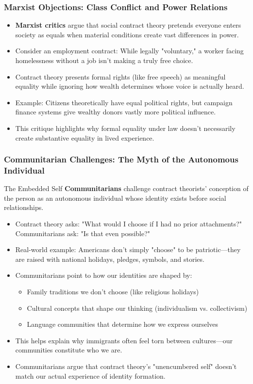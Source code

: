 \documentclass[aspectratio=169]{beamer}
\begin{document}
\begin{frame}
  \frametitle{Marxist Objections: Class Conflict and Power Relations}
  
  \begin{itemize}
    \item \textbf{Marxist critics} argue that social contract theory pretends everyone enters society as equals when material conditions create vast differences in power.
    \item Consider an employment contract: While legally "voluntary," a worker facing homelessness without a job isn't making a truly free choice.
    \item Contract theory presents formal rights (like free speech) as meaningful equality while ignoring how wealth determines whose voice is actually heard.
    \item Example: Citizens theoretically have equal political rights, but campaign finance systems give wealthy donors vastly more political influence.
    \item This critique highlights why formal equality under law doesn't necessarily create substantive equality in lived experience.
  \end{itemize}
\end{frame}

\begin{frame}
  \frametitle{Communitarian Challenges: The Myth of the Autonomous Individual}
  
  \begin{alertblock}{The Embedded Self}
    \textbf{Communitarians} challenge contract theorists' conception of the person as an autonomous individual whose identity exists before social relationships.
  \end{alertblock}
  
  \begin{itemize}
    \item Contract theory asks: "What would I choose if I had no prior attachments?" Communitarians ask: "Is that even possible?"
    \item Real-world example: Americans don't simply "choose" to be patriotic—they are raised with national holidays, pledges, symbols, and stories.
    \item Communitarians point to how our identities are shaped by:
      \begin{itemize}
        \item Family traditions we don't choose (like religious holidays)
        \item Cultural concepts that shape our thinking (individualism vs. collectivism)
        \item Language communities that determine how we express ourselves
      \end{itemize}
    \item This helps explain why immigrants often feel torn between cultures—our communities constitute who we are.
    \item Communitarians argue that contract theory's "unencumbered self" doesn't match our actual experience of identity formation.
  \end{itemize}
\end{frame}
\end{document}
